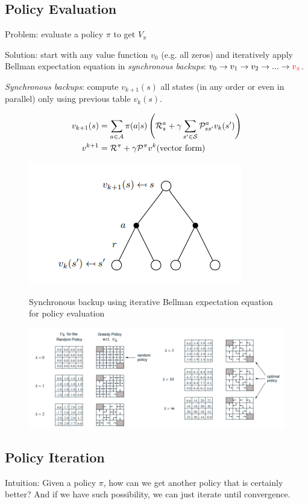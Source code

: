 \subsection{Policy Evaluation}
Problem: evaluate a policy $\pi$ to get $V_\pi$

Solution: start with any value function $v_0$ (e.g. all zeros) and iteratively apply Bellman expectation equation in \textit{synchronous backups}: $v_0 \to v_1 \to v_2 \to ... \to \textcolor{red}{v_\pi}$.

\textit{Synchronous backups}: compute $v_{k+1}(s)$ all states (in any order or even in parallel) only using previous table $v_{k}(s)$.


\begin{figure}[ht]
	\begin{minipage}{0.5\textwidth} %
\begin{align*}
	v_{k+1}(s) &= \sum_{a\in \mathcal{A}}  \pi(a|s) \left(\mathcal{R}_s^a + \gamma \sum_{s' \in \mathcal{S}} \mathcal{P}_{s s'}^a v_{k}(s')\right) \\
	v^{k+1} &= \mathcal{R}^\pi + \gamma \mathcal{P}^{\pi} v^k  \text{(vector form)} \notag	
\end{align*}
	\end{minipage}%
	\begin{minipage}{0.5\textwidth} %
	\centering
\includegraphics[width=0.6\linewidth]{img/dynprog_eval_sync_backup_tree}
\label{fig:dynprogevalsyncbackuptree}
	\end{minipage}
\caption{Synchronous backup using iterative Bellman expectation equation for policy evaluation}
\end{figure}


\begin{figure}[h]
	\centering
	\includegraphics[width=1\linewidth]{img/dynprog_evaluation_random_policy}
	\caption{}
	\label{fig:dynprogevaluationrandompolicy}
\end{figure}


\subsection{Policy Iteration}
Intuition: Given a policy $\pi$, how can we get another policy that is certainly better? And if we have such possibility, we can just iterate until convergence.